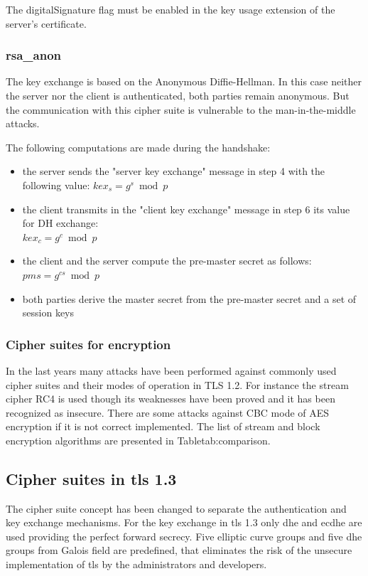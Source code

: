 The digitalSignature flag must be enabled in the key usage extension of the server's certificate.

\subsubsection*{\gls{rsa}\_anon}
The key exchange is based on the Anonymous Diffie-Hellman. In this case neither the server nor the client is authenticated, both parties remain anonymous. But the communication with this cipher suite is vulnerable to the man-in-the-middle attacks.

The following computations are made during the handshake:
\begin{itemize}
	\item the server sends the "server key exchange" message in step 4 with the following value: $\displaystyle kex_s = g^s \bmod p $ 
	\item the client transmits in the "client key exchange" message in step 6 its value for DH exchange: \\ $\displaystyle kex_c = g^c \bmod p $ 
	\item the client and the server compute the pre-master secret as follows: $\displaystyle pms = g^{cs} \bmod p$
	\item both parties derive the master secret from the pre-master secret and a set of session keys
\end{itemize}

\subsubsection*{Cipher suites for encryption}

In the last years many attacks have been performed against commonly used cipher suites and their modes of operation in TLS 1.2. For instance the stream cipher RC4 is used though its weaknesses have been proved and it has been recognized as insecure. There are some attacks against CBC mode of AES encryption if it is not correct implemented.
The list of stream and block encryption algorithms are presented in Table{tab:comparison}.


\subsection{Cipher suites in \gls{tls} 1.3}
\label{subsec:ciphersuits1_3}

The cipher suite concept has been changed to separate the authentication and key exchange mechanisms.
For the key exchange in \gls{tls} 1.3 only \gls{dhe} and \gls{ecdhe} are used providing the perfect forward secrecy. Five elliptic curve groups and five \gls{dhe} groups from Galois field are predefined, that eliminates the risk of the unsecure implementation of \gls{tls} by the administrators and developers.

